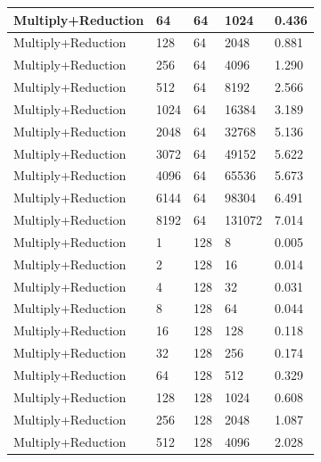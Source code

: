 \documentclass{article}
\begin{document}
\begin{longtable}{|l|l|l|l|l|}
Multiply+Reduction & 64   & 64          & 1024              & 0.436             \\ \hline
Multiply+Reduction & 128  & 64          & 2048              & 0.881             \\ \hline
Multiply+Reduction & 256  & 64          & 4096              & 1.290             \\ \hline
Multiply+Reduction & 512  & 64          & 8192              & 2.566             \\ \hline
Multiply+Reduction & 1024 & 64          & 16384             & 3.189             \\ \hline
Multiply+Reduction & 2048 & 64          & 32768             & 5.136             \\ \hline
Multiply+Reduction & 3072 & 64          & 49152             & 5.622             \\ \hline
Multiply+Reduction & 4096 & 64          & 65536             & 5.673             \\ \hline
Multiply+Reduction & 6144 & 64          & 98304             & 6.491             \\ \hline
Multiply+Reduction & 8192 & 64          & 131072            & 7.014             \\ \hline
Multiply+Reduction & 1    & 128         & 8                 & 0.005             \\ \hline
Multiply+Reduction & 2    & 128         & 16                & 0.014             \\ \hline
Multiply+Reduction & 4    & 128         & 32                & 0.031             \\ \hline
Multiply+Reduction & 8    & 128         & 64                & 0.044             \\ \hline
Multiply+Reduction & 16   & 128         & 128               & 0.118             \\ \hline
Multiply+Reduction & 32   & 128         & 256               & 0.174             \\ \hline
Multiply+Reduction & 64   & 128         & 512               & 0.329             \\ \hline
Multiply+Reduction & 128  & 128         & 1024              & 0.608             \\ \hline
Multiply+Reduction & 256  & 128         & 2048              & 1.087             \\ \hline
Multiply+Reduction & 512  & 128         & 4096              & 2.028             \\ \hline

\end{longtable}
\end{document}
